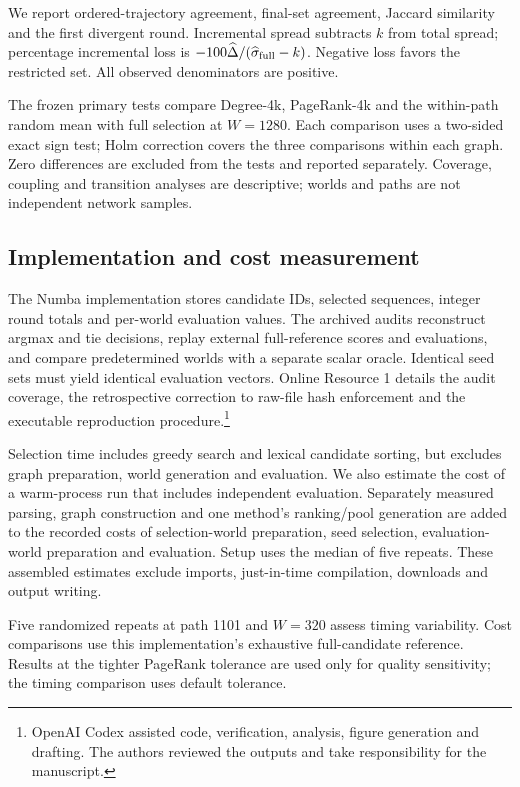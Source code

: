 \documentclass[smallextended]{svjour3}
\begin{document}
We report ordered-trajectory agreement, final-set agreement, Jaccard similarity and the first divergent round. Incremental spread subtracts $k$ from total spread; percentage incremental loss is $-100\widehat\Delta/(\widehat\sigma_{\rm full}-k)$. Negative loss favors the restricted set. All observed denominators are positive.

The frozen primary tests compare Degree-4k, PageRank-4k and the within-path random mean with full selection at $W=1280$. Each comparison uses a two-sided exact sign test; Holm correction covers the three comparisons within each graph. Zero differences are excluded from the tests and reported separately. Coverage, coupling and transition analyses are descriptive; worlds and paths are not independent network samples.

\subsection{Implementation and cost measurement}
The Numba implementation stores candidate IDs, selected sequences, integer round totals and per-world evaluation values. The archived audits reconstruct argmax and tie decisions, replay external full-reference scores and evaluations, and compare predetermined worlds with a separate scalar oracle. Identical seed sets must yield identical evaluation vectors. Online Resource 1 details the audit coverage, the retrospective correction to raw-file hash enforcement and the executable reproduction procedure.\footnote{OpenAI Codex assisted code, verification, analysis, figure generation and drafting. The authors reviewed the outputs and take responsibility for the manuscript.}

Selection time includes greedy search and lexical candidate sorting, but excludes graph preparation, world generation and evaluation. We also estimate the cost of a warm-process run that includes independent evaluation. Separately measured parsing, graph construction and one method's ranking/pool generation are added to the recorded costs of selection-world preparation, seed selection, evaluation-world preparation and evaluation. Setup uses the median of five repeats. These assembled estimates exclude imports, just-in-time compilation, downloads and output writing.

Five randomized repeats at path 1101 and $W=320$ assess timing variability. Cost comparisons use this implementation's exhaustive full-candidate reference. Results at the tighter PageRank tolerance are used only for quality sensitivity; the timing comparison uses default tolerance.
\end{document}
